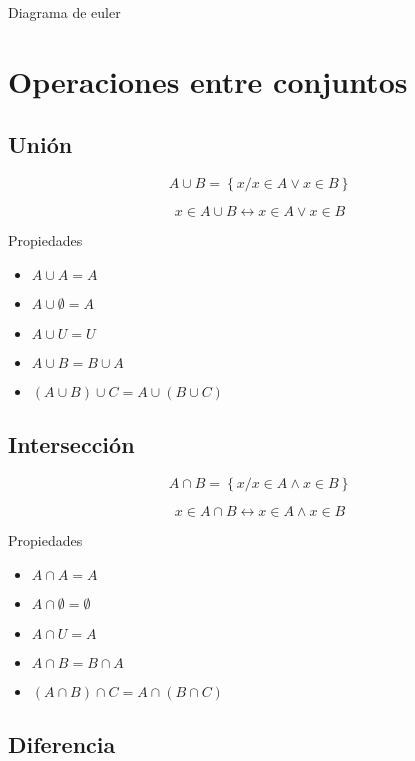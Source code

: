 \documentclass[
  16pt,
]{krantz}
\providecommand{\tightlist}{%
  \setlength{\itemsep}{0pt}\setlength{\parskip}{0pt}}
\theoremstyle{definition}
\theoremstyle{definition}
\theoremstyle{definition}
\theoremstyle{definition}
\theoremstyle{remark}
\begin{document}
Diagrama de euler

\hypertarget{operaciones-entre-conjuntos}{%
\section{Operaciones entre conjuntos}\label{operaciones-entre-conjuntos}}

\hypertarget{uniuxf3n}{%
\subsection{Unión}\label{uniuxf3n}}

\[
A\cup B=\left\{x/x\in A\vee x\in B\right\}
\]

\[
x\in A\cup B\leftrightarrow x\in A\vee x\in B
\]

Propiedades

\begin{itemize}
\tightlist
\item
  \(A\cup A=A\)
\item
  \(A\cup \emptyset=A\)
\item
  \(A\cup U=U\)
\item
  \(A\cup B=B\cup A\)
\item
  \((A\cup B)\cup C=A\cup(B\cup C)\)
\end{itemize}

\hypertarget{intersecciuxf3n}{%
\subsection{Intersección}\label{intersecciuxf3n}}

\[
A\cap B=\left\{x/x\in A\wedge x\in B\right\}
\]

\[
x\in A\cap B\leftrightarrow x\in A\wedge x\in B
\]

Propiedades

\begin{itemize}
\tightlist
\item
  \(A\cap A=A\)
\item
  \(A\cap \emptyset=\emptyset\)
\item
  \(A\cap U=A\)
\item
  \(A\cap B=B\cap A\)
\item
  \((A\cap B)\cap C=A\cap(B\cap C)\)
\end{itemize}

\hypertarget{diferencia}{%
\subsection{Diferencia}\label{diferencia}}
\end{document}
